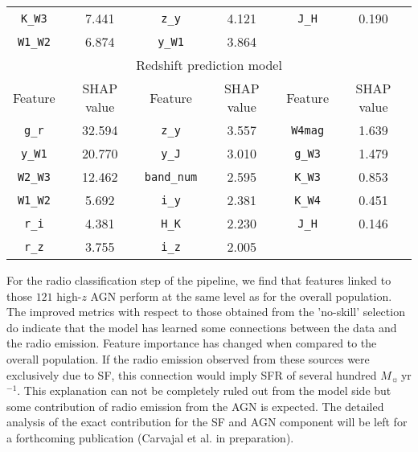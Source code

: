 \documentclass{aa}
\begin{document}
\begin{table}
{\begin{tabular}{c c c c c c}
\texttt{K\_W3}    &  7.441        & \texttt{z\_y}         & 4.121         & \texttt{J\_H}       & 0.190      \\
\texttt{W1\_W2}   &  6.874        & \texttt{y\_W1}        & 3.864         &                     &            \\[0.5em]
\hline\hline
\multicolumn{6}{c}{Redshift prediction model} \\
Feature             & SHAP value    & Feature             & SHAP value    & Feature         & SHAP value \\
\hline
\texttt{g\_r}       & 32.594        & \texttt{z\_y}       & 3.557         & \texttt{W4mag}  & 1.639    \\
\texttt{y\_W1}      & 20.770        & \texttt{y\_J}       & 3.010         & \texttt{g\_W3}  & 1.479    \\
\texttt{W2\_W3}     & 12.462        & \texttt{band\_num}  & 2.595         & \texttt{K\_W3}  & 0.853    \\
\texttt{W1\_W2}     &  5.692        & \texttt{i\_y}       & 2.381         & \texttt{K\_W4}  & 0.451    \\
\texttt{r\_i}       &  4.381        & \texttt{H\_K}       & 2.230         & \texttt{J\_H}   & 0.146    \\
\texttt{r\_z}       &  3.755        & \texttt{i\_z}       & 2.005         &                 &          \\
\hline
\end{tabular}
}
\end{table}

For the radio classification step of the pipeline, we find that features linked to those $121$ high-$z$ AGN perform at the same level as for the overall population. %
The improved metrics with respect to those obtained from the 'no-skill' selection do indicate that the model has learned some connections between the data and the radio emission. Feature importance has changed when compared to the overall population. If the radio emission observed from these sources were exclusively due to SF, this connection would imply SFR of several hundred $M_\sun$\,yr$^{-1}$. This explanation can not be completely ruled out from the model side but some contribution of radio emission from the AGN is expected. The detailed analysis of the exact contribution for the SF and AGN component will be left for a forthcoming publication (Carvajal et al. in preparation). 
\end{document}
